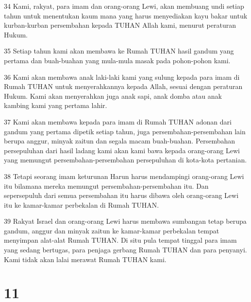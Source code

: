 \par 34 Kami, rakyat, para imam dan orang-orang Lewi, akan membuang undi setiap tahun untuk menentukan kaum mana yang harus menyediakan kayu bakar untuk kurban-kurban persembahan kepada TUHAN Allah kami, menurut peraturan Hukum.
\par 35 Setiap tahun kami akan membawa ke Rumah TUHAN hasil gandum yang pertama dan buah-buahan yang mula-mula masak pada pohon-pohon kami.
\par 36 Kami akan membawa anak laki-laki kami yang sulung kepada para imam di Rumah TUHAN untuk menyerahkannya kepada Allah, sesuai dengan peraturan Hukum. Kami akan menyerahkan juga anak sapi, anak domba atau anak kambing kami yang pertama lahir.
\par 37 Kami akan membawa kepada para imam di Rumah TUHAN adonan dari gandum yang pertama dipetik setiap tahun, juga persembahan-persembahan lain berupa anggur, minyak zaitun dan segala macam buah-buahan. Persembahan persepuluhan dari hasil ladang kami akan kami bawa kepada orang-orang Lewi yang memungut persembahan-persembahan persepuluhan di kota-kota pertanian.
\par 38 Tetapi seorang imam keturunan Harun harus mendampingi orang-orang Lewi itu bilamana mereka memungut persembahan-persembahan itu. Dan sepersepuluh dari semua persembahan itu harus dibawa oleh orang-orang Lewi itu ke kamar-kamar perbekalan di Rumah TUHAN.
\par 39 Rakyat Israel dan orang-orang Lewi harus membawa sumbangan tetap berupa gandum, anggur dan minyak zaitun ke kamar-kamar perbekalan tempat menyimpan alat-alat Rumah TUHAN. Di situ pula tempat tinggal para imam yang sedang bertugas, para penjaga gerbang Rumah TUHAN dan para penyanyi. Kami tidak akan lalai merawat Rumah TUHAN kami.

\chapter{11}

